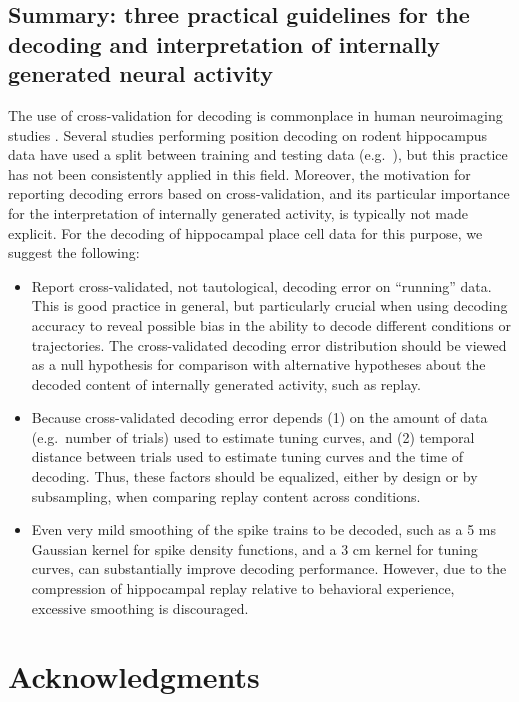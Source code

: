 \documentclass[11pt]{article}
\let\cite=\citep
\let\citeNP=\citealt
\begin{document}
\subsection*{Summary: three practical guidelines for the decoding
  and interpretation of internally generated neural activity}

The use of cross-validation for decoding is commonplace in human
neuroimaging studies
\cite{Pereira2009,Shirer2012,Varoquaux2016}. Several studies
performing position decoding on rodent hippocampus data have used a
split between training and testing data
(e.g.\ \citeNP{Zhang1998,Rutishauser2006,Davidson2009,Resnik2012,Agarwal2014}),
but this practice has not been consistently applied in this
field. Moreover, the motivation for reporting decoding errors based on
cross-validation, and its particular importance for the interpretation
of internally generated activity, is typically not made explicit. For
the decoding of hippocampal place cell data for this purpose, we
suggest the following:

\begin{itemize}
\item{Report cross-validated, not tautological, decoding error on
  ``running'' data. This is good practice in general, but particularly
  crucial when using decoding accuracy to reveal possible bias in the
  ability to decode different conditions or trajectories. {\color{red}
    The cross-validated decoding error distribution should be viewed
    as a null hypothesis for comparison with alternative hypotheses
    about the decoded content of internally generated activity, such
    as replay.}}
\item{{\color{red} Because cross-validated decoding error depends (1)
    on the amount of data (e.g.\ number of trials) used to estimate
    tuning curves, and (2) temporal distance between trials used to
    estimate tuning curves and the time of decoding. Thus, these
    factors should be equalized, either by design or by subsampling,
    when comparing replay content across conditions.}}
\item{Even very mild smoothing of the spike trains to be decoded, such
  as a 5 ms Gaussian kernel for spike density functions, and a 3 cm
  kernel for tuning curves, can substantially improve
  decoding performance. {\color{red} However, due to the compression
    of hippocampal replay relative to behavioral experience, excessive
    smoothing is discouraged.}}
\end{itemize}


\section*{Acknowledgments}
\end{document}
